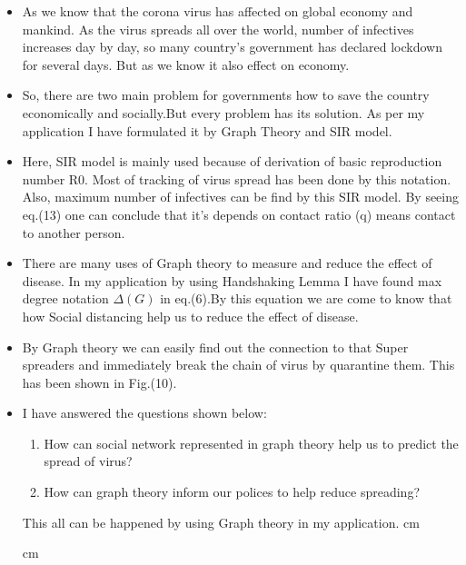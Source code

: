 \documentclass[12pt]{article}
\begin{document}
{\begin{itemize}
\thispagestyle{empty}
\item  As we know that the corona virus has affected on global economy and mankind. As the virus spreads all over the world, number of infectives increases day by day, so many country’s government has declared lockdown for several days. But as we know it also effect on economy.
\item So, there are two main problem for governments how to save the country economically and socially.But every problem has its solution. As per my application I have formulated it by Graph Theory and SIR model.
\item Here, SIR model is mainly used because of derivation of basic reproduction number R0. Most of tracking of virus spread has been done by this notation. Also, maximum number of infectives can be find by this SIR model. By seeing eq.(13) one can conclude that it’s depends on contact ratio (q) means contact to another person.
\item	There are many uses of Graph theory to measure and reduce the effect of disease. In my application by using Handshaking Lemma I have found max degree notation $\Delta (G)$  in eq.(6).By this equation we are come to know that how Social distancing help us to reduce the effect of disease.
\item 	By Graph theory we can easily find out the connection to that Super spreaders and immediately break the chain of virus by quarantine them. This has been shown in Fig.(10).
\item	I have answered the questions shown below:
\begin{enumerate}
\item  How can social network represented in graph theory help us to predict the spread of virus?
\item  How can graph theory inform our polices to help reduce spreading?
\end{enumerate}
\par This all can be happened by using Graph theory in my application.
 cm
 cm


\end{itemize}}
\end{document}
